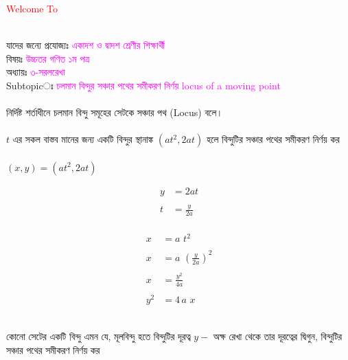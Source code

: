 \documentclass{article}
\begin{document}
 
	\Large
	\textcolor{red}{Welcome To} 
	\\
	\\
	যাদের জন্যে প্রযোজ্যঃ  	\textcolor{magenta}{একাদশ ও দ্বাদশ শ্রেণীর শিক্ষার্থী} \\
	বিষয়ঃ \textcolor{magenta}{উচ্চতর গণিত ১ম পত্র} \\
	অধ্যায়ঃ \textcolor{magenta}{৩-সরলরেখা}\\ 
	Subtopicঃ  \textcolor{magenta}{চলমান বিন্দুর সঞ্চার পথের সমীকরণ নির্ণয় locus of a moving point }\\
	\\
	নির্দিষ্ট শর্তাধীনে চলমান বিন্দু সমূহের সেটকে সঞ্চার পথ (Locus) বলে। \\
	\\
	$t$	এর সকল বাস্তব মানের জন্য একটি বিন্দুর স্থানাঙ্ক $(at^2,2at)$ হলে বিন্দুটির সঞ্চার পথের সমীকরণ নির্ণয় কর \\
	\\ 
	$(x,y)=(at^2,2at)$\\
	\begin{multicols}{2}
		\begin{align*}
			y&=2at\\
			\\
			t&=\frac{y}{2a}
		\end{align*}
		\\
		\begin{align*}
			x&=a\,\,t^2\\
			\\
			x&=a\,\,\left(\frac{y}{2a}\right)^2\\
			\\
			x&=\frac{y^2}{4a}\\
			\\
			y^2&=4\,a\,\,x
		\end{align*}
	\end{multicols}
\\
	কোনো সেটের একটি বিন্দু এমন যে, মূলবিন্দু হতে বিন্দুটির দূরত্ব $y-$ অক্ষ রেখা থেকে  তার দূরত্বের দ্বিগুন, বিন্দুটির সঞ্চার পথের সমীকরণ নির্ণয় কর\\
\end{document}
